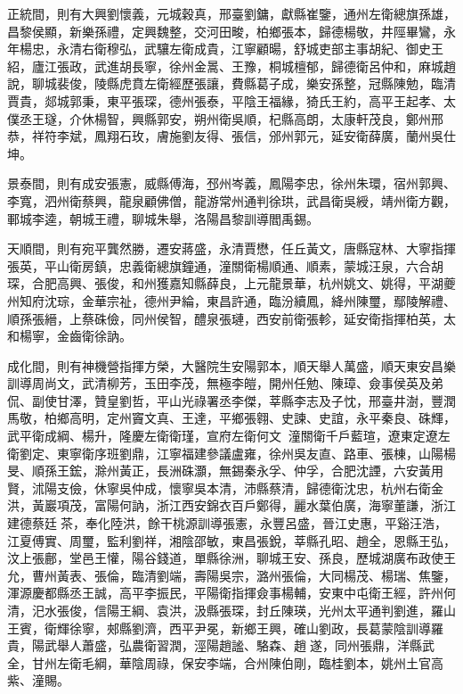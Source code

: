 \begin{pinyinscope}
正統間，則有大興劉懷義，元城穀真，邢臺劉鏞，獻縣崔鑒，通州左衛總旗孫雄，昌黎侯顯，新樂孫禮，定興魏整，交河田畯，柏鄉張本，歸德楊敬，井陘畢鸞，永年楊忠，永清右衛穆弘，武驤左衛成貴，江寧顧暘，舒城吏部主事胡紀、御史王紹，廬江張政，武進胡長寧，徐州金暠、王豫，桐城檀郁，歸德衛呂仲和，麻城趙說，聊城裴俊，陵縣虎賁左衛經歷張讓，費縣葛子成，樂安孫整，冠縣陳勉，臨清賈貴，郯城郭秉，東平張琛，德州張泰，平陰王福緣，猗氏王約，高平王起孝、太僕丞王璲，介休楊智，興縣郭安，朔州衛吳順，杞縣高朗，太康軒茂良，鄭州邢恭，祥符李斌，鳳翔石玫，膚施劉友得、張信，邠州郭元，延安衛薛廣，蘭州吳仕坤。

景泰間，則有成安張憲，威縣傅海，邳州岑義，鳳陽李忠，徐州朱環，宿州郭興、李寬，泗州衛蔡興，龍泉顧佛僧，龍游常州通判徐珙，武昌衛吳綬，靖州衛方觀，鄆城李逵，朝城王禮，聊城朱舉，洛陽昌黎訓導閻禹錫。

天順間，則有宛平龔然勝，遷安蔣盛，永清賈懋，任丘黃文，唐縣寇林、大寧指揮張英，平山衛房鎮，忠義衛總旗鐘通，潼關衛楊順通、順素，蒙城汪泉，六合胡琛，合肥高興、張俊，和州獲嘉知縣薛良，上元龍景華，杭州姚文、姚得，平湖夔州知府沈琮，金華宗祉，德州尹綸，東昌許通，臨汾續鳳，絳州陳璽，鄢陵解禮、順孫張縉，上蔡硃儉，同州侯智，醴泉張璉，西安前衛張軫，延安衛指揮柏英，太和楊寧，金齒衛徐訥。

成化間，則有神機營指揮方榮，大醫院生安陽郭本，順天舉人萬盛，順天東安昌樂訓導周尚文，武清柳芳，玉田李茂，無極李皚，開州任勉、陳璋、僉事侯英及弟侃、副使甘澤，贊皇劉哲，平山光祿署丞李傑，莘縣李志及子忱，邢臺井澍，豐潤馬敬，柏鄉高明，定州竇文真、王達，平鄉張翱、史諫、史誼，永平秦良、硃輝，武平衛成綱、楊升，隆慶左衛衛瑾，宣府左衛何文，潼關衛千戶藍瑄，遼東定遼左衛劉定、東寧衛序班劉鼎，江寧福建參議盧雍，徐州吳友直、路車、張棟，山陽楊旻、順孫王鋐，滁州黃正，長洲硃灝，無錫秦永孚、仲孚，合肥沈諲，六安黃用賢，沭陽支儉，休寧吳仲成，懷寧吳本清，沛縣蔡清，歸德衛沈忠，杭州右衛金洪，黃巖項茂，富陽何訥，浙江西安錦衣百戶鄭得，麗水葉伯廣，海寧董謙，浙江建德蔡廷茶，奉化陸洪，餘干桃源訓導張憲，永豐呂盛，晉江史惠，平谿汪浩，江夏傅實、周璽，監利劉祥，湘陰邵敏，東昌張銳，莘縣孔昭、趙全，恩縣王弘，汶上張鄜，堂邑王懽，陽谷錢道，單縣徐洲，聊城王安、孫良，歷城湖廣布政使王允，曹州黃表、張倫，臨清劉端，壽陽吳宗，潞州張倫，大同楊茂、楊瑞、焦鑒，渾源慶都縣丞王誠，高平李振民，平陽衛指揮僉事楊輔，安東中屯衛王經，許州何清，汜水張俊，信陽王綱、袁洪，汲縣張琛，封丘陳瑛，光州太平通判劉進，羅山王賓，衛輝徐寧，郟縣劉濟，西平尹冕，新鄉王興，確山劉政，長葛蒙陰訓導羅貴，陽武舉人蕭盛，弘農衛習潤，涇陽趙謐、駱森、趙遂，同州張鼎，洋縣武全，甘州左衛毛綱，華陰周祿，保安李端，合州陳伯剛，臨桂劉本，姚州土官高紫、潼賜。


\end{pinyinscope}
